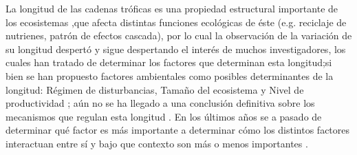 La longitud de las cadenas tr\'oficas es una propiedad estructural importante de los ecosistemas ,que afecta distintas funciones ecol\'ogicas de \'este (e.g. reciclaje de nutrienes, patr\'on de efectos cascada), por lo cual  la observaci\'on de la variaci\'on de su longitud despert\'o y sigue despertando el inter\'es de muchos investigadores\citep{ulanowicz2014limits,borrelli2014there}, los cuales han tratado de determinar los factores que determinan esta longitud;si bien se han propuesto factores ambientales como posibles determinantes de la longitud: R\'egimen de disturbancias, Tama\~no del ecosistema y Nivel de productividad \citep{post2002long,takimoto2013environmental}; a\'un no se ha llegado a una conclusi\'on definitiva sobre los mecanismos que regulan esta longitud \citep{sterner1997enigma,takimoto2013environmental}. En los \'ultimos a\~nos se a pasado de determinar qu\'e factor es m\'as importante a determinar c\'omo los distintos factores interactuan entre s\'i y bajo que contexto son m\'as o menos importantes \citep{post2002long}.\\

